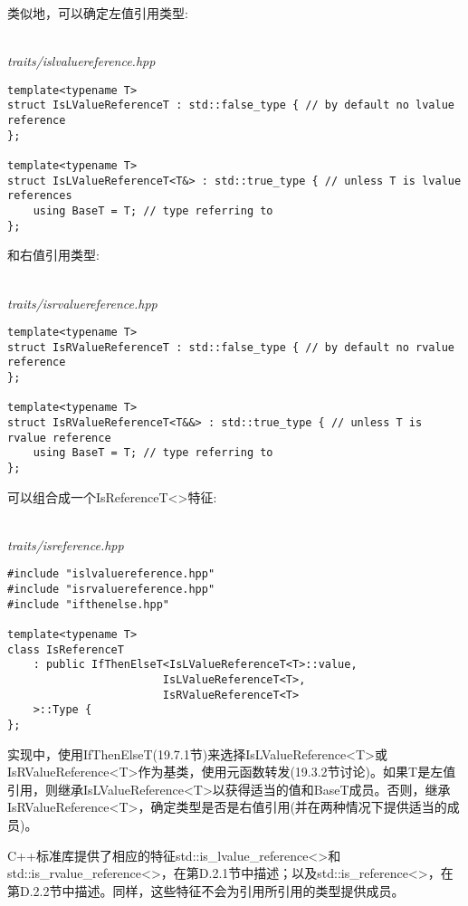 类似地，可以确定左值引用类型:

\hspace*{\fill} \\ %
\noindent
\textit{traits/islvaluereference.hpp}
\begin{lstlisting}[style=styleCXX]
template<typename T>
struct IsLValueReferenceT : std::false_type { // by default no lvalue reference
};

template<typename T>
struct IsLValueReferenceT<T&> : std::true_type { // unless T is lvalue references
	using BaseT = T; // type referring to
};
\end{lstlisting}

和右值引用类型:

\hspace*{\fill} \\ %
\noindent
\textit{traits/isrvaluereference.hpp}
\begin{lstlisting}[style=styleCXX]
template<typename T>
struct IsRValueReferenceT : std::false_type { // by default no rvalue reference
};

template<typename T>
struct IsRValueReferenceT<T&&> : std::true_type { // unless T is rvalue reference
	using BaseT = T; // type referring to
};
\end{lstlisting}

可以组合成一个IsReferenceT<>特征:

\hspace*{\fill} \\ %
\noindent
\textit{traits/isreference.hpp}
\begin{lstlisting}[style=styleCXX]
#include "islvaluereference.hpp"
#include "isrvaluereference.hpp"
#include "ifthenelse.hpp"

template<typename T>
class IsReferenceT
	: public IfThenElseT<IsLValueReferenceT<T>::value,
						IsLValueReferenceT<T>,
						IsRValueReferenceT<T>
	>::Type {
};
\end{lstlisting}

实现中，使用IfThenElseT(19.7.1节)来选择IsLValueReference<T>或IsRValueReference<T>作为基类，使用元函数转发(19.3.2节讨论)。如果T是左值引用，则继承IsLValueReference<T>以获得适当的值和BaseT成员。否则，继承IsRValueReference<T>，确定类型是否是右值引用(并在两种情况下提供适当的成员)。

C++标准库提供了相应的特征std::is\_lvalue\_reference<>和std::is\_rvalue\_reference<>，在第D.2.1节中描述；以及std::is\_reference<>，在第D.2.2节中描述。同样，这些特征不会为引用所引用的类型提供成员。

